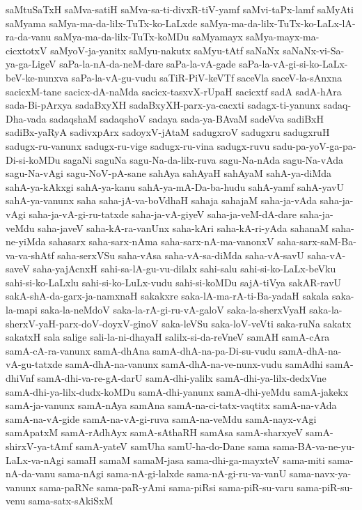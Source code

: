 {saMtuSaTxH
saMva-satiH
saMva-sa-ti-divxR-tiV-yamf
saMvi-taPx-lamf
saMyAti
saMyama
saMya-ma-da-lilx-TuTx-ko-LaLxde
saMya-ma-da-lilx-TuTx-ko-LaLx-lA-ra-da-vanu
saMya-ma-da-lilx-TuTx-koMDu
saMyamayx
saMya-mayx-ma-cicxtotxV
saMyoV-ja-yanitx
saMyu-nakutx
saMyu-tAtf
saNaNx
saNaNx-vi-Sa-ya-ga-LigeV
saPa-la-nA-da-neM-dare
saPa-la-vA-gade
saPa-la-vA-gi-si-ko-LaLx-beV-ke-nunxva
saPa-la-vA-gu-vudu
saTiR-PiV-keVTf
saceVla
saceV-la-sAnxna
sacicxM-tane
sacicx-dA-naMda
sacicx-tasxvX-rUpaH
sacicxtf
sadA
sadA-hAra
sada-Bi-pArxya
sadaBxyXH
sadaBxyXH-parx-ya-cacxti
sadagx-ti-yanunx
sadaq-Dha-vada
sadaqshaM
sadaqshoV
sadaya
sada-ya-BAvaM
sadeVva
sadiBxH
sadiBx-yaRyA
sadivxpArx
sadoyxV-jAtaM
sadugxroV
sadugxru
sadugxruH
sadugx-ru-vanunx
sadugx-ru-vige
sadugx-ru-vina
sadugx-ruvu
sadu-pa-yoV-ga-pa-Di-si-koMDu
sagaNi
saguNa
sagu-Na-da-lilx-ruva
sagu-Na-nAda
sagu-Na-vAda
sagu-Na-vAgi
sagu-NoV-pA-sane
sahAya
sahAyaH
sahAyaM
sahA-ya-diMda
sahA-ya-kAkxgi
sahA-ya-kanu
sahA-ya-mA-Da-ba-hudu
sahA-yamf
sahA-yavU
sahA-ya-vanunx
saha
saha-jA-va-boVdhaH
sahaja
sahajaM
saha-ja-vAda
saha-ja-vAgi
saha-ja-vA-gi-ru-tatxde
saha-ja-vA-giyeV
saha-ja-veM-dA-dare
saha-ja-veMdu
saha-javeV
saha-kA-ra-vanUnx
saha-kAri
saha-kA-ri-yAda
sahanaM
saha-ne-yiMda
sahasarx
saha-sarx-nAma
saha-sarx-nA-ma-vanonxV
saha-sarx-saM-Ba-va-va-shAtf
saha-serxVSu
saha-vAsa
saha-vA-sa-diMda
saha-vA-savU
saha-vA-saveV
saha-yajAcnxH
sahi-sa-lA-gu-vu-dilalx
sahi-salu
sahi-si-ko-LaLx-beVku
sahi-si-ko-LaLxlu
sahi-si-ko-LuLx-vudu
sahi-si-koMDu
sajA-tiVya
sakAR-ravU
sakA-shA-da-garx-ja-namxnaH
sakakxre
saka-lA-ma-rA-ti-Ba-yadaH
sakala
saka-la-mapi
saka-la-neMdoV
saka-la-rA-gi-ru-vA-galoV
saka-la-sherxVyaH
saka-la-sherxV-yaH-parx-doV-doyxV-ginoV
saka-leVSu
saka-loV-veVti
saka-ruNa
sakatx
sakatxH
sala
salige
sali-la-ni-dhayaH
salilx-si-da-reVneV
samAH
samA-cAra
samA-cA-ra-vanunx
samA-dhAna
samA-dhA-na-pa-Di-su-vudu
samA-dhA-na-vA-gu-tatxde
samA-dhA-na-vanunx
samA-dhA-na-ve-nunx-vudu
samAdhi
samA-dhiVnf
samA-dhi-va-re-gA-darU
samA-dhi-yalilx
samA-dhi-ya-lilx-dedxVne
samA-dhi-ya-lilx-dudx-koMDu
samA-dhi-yanunx
samA-dhi-yeMdu
samA-jakekx
samA-ja-vanunx
samA-nAya
samAna
samA-na-ci-tatx-vaqtitx
samA-na-vAda
samA-na-vA-gide
samA-na-vA-gi-ruva
samA-na-veMdu
samA-nayx-vAgi
samApatxM
samA-rAdhAyx
samA-sAthaRH
samAsa
samA-sharxyeV
samA-shirxV-ya-tAmf
samA-yateV
samUha
samU-ha-do-Dane
sama
sama-BA-va-ne-yu-LaLx-va-nAgi
samaH
samaM
samaM-jasa
sama-dhi-ga-mayxteV
sama-miti
sama-nA-da-vanu
sama-nAgi
sama-nA-gi-lalxde
sama-nA-gi-ru-va-vanU
sama-navx-ya-vanunx
sama-paRNe
sama-paR-yAmi
sama-piRsi
sama-piR-su-varu
sama-piR-su-venu
sama-satx-sAkiSxM
}
